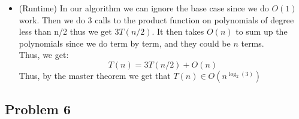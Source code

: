 \documentclass[12pt, letterpaper]{article}
\theoremstyle{definition}
\newcommand{\N}{\mathbb{N}}
\begin{document}
\begin{enumerate}[(a)]
\begin{itemize}
\begin{proof}
            Thus, by induction we can multiply for all $n \in \N$
        \end{proof}
        \item (Runtime) In our algorithm we can ignore the base case since we do $O(1)$ work. Then we do 3 calls to the product function on polynomials of degree less than n/2 thus we get $3T(n/2)$. It then takes $O(n)$ to sum up the polynomials since we do term by term, and they could be $n$ terms.\\
        Thus, we get:
        \[T(n)=3T(n/2)+O(n)\]
        Thus, by the master theorem we get that $T(n) \in O(n^{\log_2(3)})$
    \end{itemize}
\end{enumerate}

\newpage
\subsection*{Problem 6}
\end{document}
